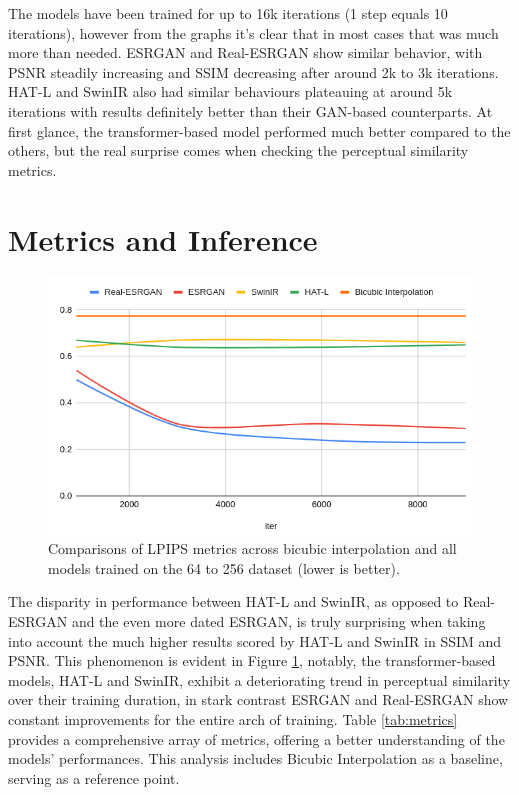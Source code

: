 The models have been trained for up to 16k iterations (1 step equals 10 iterations), however from the graphs it's clear that in most cases that was much more than needed. ESRGAN and Real-ESRGAN show similar behavior, with PSNR steadily increasing and SSIM decreasing after around 2k to 3k iterations. HAT-L and SwinIR also had similar behaviours plateauing at around 5k iterations with results definitely better than their GAN-based counterparts. At first glance, the transformer-based model performed much better compared to the others, but the real surprise comes when checking the perceptual similarity metrics.

\section{Metrics and Inference}

\begin{figure}[H]
  \centering
  \includegraphics[scale=0.4]{figures/LPIPS_2.png}
  \caption{Comparisons of LPIPS metrics across bicubic interpolation and all models trained on the 64 to 256 dataset (lower is better).}
  \label{img:lpips}
\end{figure}


The disparity in performance between HAT-L and SwinIR, as opposed to Real-ESRGAN and the even more dated ESRGAN, is truly surprising when taking into account the much higher results scored by HAT-L and SwinIR in SSIM and PSNR. This phenomenon is evident in Figure \ref{img:lpips}, notably, the transformer-based models, HAT-L and SwinIR, exhibit a deteriorating trend in perceptual similarity over their training duration, in stark contrast ESRGAN and Real-ESRGAN show constant improvements for the entire arch of training. Table \ref{tab:metrics} provides a comprehensive array of metrics, offering a better understanding of the models' performances. This analysis includes Bicubic Interpolation as a baseline, serving as a reference point.


